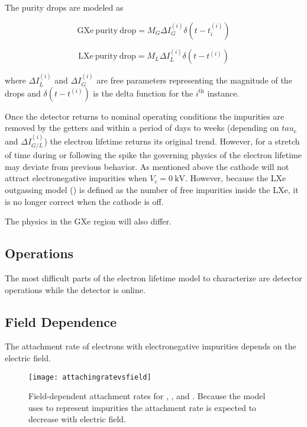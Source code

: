 The purity drops are modeled as

\begin{equation}
\mathrm{GXe\ purity\ drop} = M_G \Delta I_G^{(i)} \delta (t - t_i^{(i)})
\end{equation}

\begin{equation}
\mathrm{LXe\ purity\ drop} = M_L \Delta I_L^{(i)} \delta (t - t^{(i)})
\end{equation}

\noindent where $\Delta I_L^{(i)}$ and $\Delta I_G^{(i)}$ are free parameters representing the magnitude of the drops and
$\delta (t - t^{(i)})$ is the delta function for the $i^{\mathrm{th}}$ instance.

Once the detector returns to nominal operating conditions the impurities are removed by the getters and within a period of days to weeks
(depending on $tau_e$ and $\Delta I_{G/L}^{(i)}$) the electron lifetime returns its original trend.  However, for a stretch of time during
or following the spike the governing physics of the electron lifetime may deviate from previous behavior.  As mentioned above the
cathode will not attract electronegative impurities when $V_c = 0\ \mathrm{kV}$.  However, because the LXe outgassing model
() is defined as the number of free impurities
inside the LXe, it is no longer correct when the cathode is off.

The physics in the GXe region will also differ.



\subsection{Operations}
\label{subsec:electron_lifetime_model_ops}
The most difficult parts of the electron lifetime model to characterize are detector operations while the detector is online.



\subsection{Field Dependence}
\label{subsec:electron_lifetime_model_field}
The attachment rate of electrons with electronegative impurities depends on the electric field.

\begin{figure}
\centering
\texttt{[image: attachingratevsfield]}
\caption{Field-dependent attachment rates for , , and .  Because the model uses  to represent
impurities the attachment rate is expected to decrease with electric field.}
\label{fig:electron_lifetime_model_field_attaching_rate}
\end{figure}



